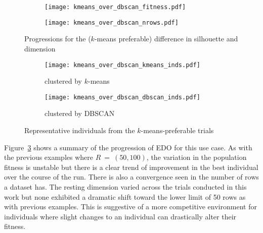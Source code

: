 \begin{figure}
    \centering
    \begin{subfigure}{\imgwidth}
        \texttt{[image: kmeans\_over\_dbscan\_fitness.pdf]}
        \label{fig:kmeans_over_dbscan_fitness}
    \end{subfigure}

    \begin{subfigure}{\imgwidth}
        \texttt{[image: kmeans\_over\_dbscan\_nrows.pdf]}
        \label{fig:kmeans_over_dbscan_nrows}
    \end{subfigure}
    \caption{%
        Progressions for the (\(k\)-means preferable) difference in silhouette
        and dimension
    }\label{fig:dbscan-silhouette}
\end{figure}

\begin{figure}
    \centering
    \begin{subfigure}{\imgwidth}
        \texttt{[image: kmeans\_over\_dbscan\_kmeans\_inds.pdf]}
        \caption{%
            clustered by \(k\)-means
        }\label{fig:kmeans_over_dbscan_kmeans_inds}
    \end{subfigure}

    \begin{subfigure}{\imgwidth}
        \texttt{[image: kmeans\_over\_dbscan\_dbscan\_inds.pdf]}
        \caption{clustered by DBSCAN}\label{fig:kmeans_over_dbscan_dbscan_inds}
    \end{subfigure}
    \caption{%
        Representative individuals from the \(k\)-means-preferable trials
    }\label{fig:dbscan-inds}
\end{figure}

Figure~\ref{fig:dbscan-silhouette} shows a summary of the progression of EDO
for this use case. As with the previous examples where \(R~=~(50, 100)\), the
variation in the population fitness is unstable but there is a clear trend of
improvement in the best individual over the course of the run. There is also a
convergence seen in the number of rows a dataset has. The resting dimension
varied across the trials conducted in this work but none exhibited a dramatic
shift toward the lower limit of 50 rows as with previous examples. This is
suggestive of a more competitive environment for individuals where slight
changes to an individual can drastically alter their fitness.

